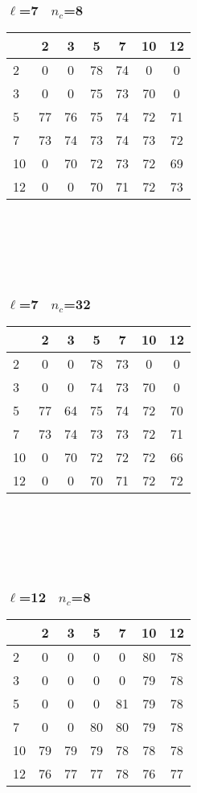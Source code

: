 \documentclass{article}
\begin{document}
\subsubsection*{$\ell$=7~ $n_c$=8}\begin{tabular}{|l|c|c|c|c|c|c|}
\hline
&2&3&5&7&10&12\\
\hline
2&0&0&78&74&0&0\\
3&0&0&75&73&70&0\\
5&77&76&75&74&72&71\\
7&73&74&73&74&73&72\\
10&0&70&72&73&72&69\\
12&0&0&70&71&72&73\\
\hline
\end{tabular}
\\ 
\\ \\ \\ 
\subsubsection*{$\ell$=7~ $n_c$=32}\begin{tabular}{|l|c|c|c|c|c|c|}
\hline
&2&3&5&7&10&12\\
\hline
2&0&0&78&73&0&0\\
3&0&0&74&73&70&0\\
5&77&64&75&74&72&70\\
7&73&74&73&73&72&71\\
10&0&70&72&72&72&66\\
12&0&0&70&71&72&72\\
\hline
\end{tabular}
\\ 
\\ \\ \\ 
\subsubsection*{$\ell$=12~ $n_c$=8}\begin{tabular}{|l|c|c|c|c|c|c|}
\hline
&2&3&5&7&10&12\\
\hline
2&0&0&0&0&80&78\\
3&0&0&0&0&79&78\\
5&0&0&0&81&79&78\\
7&0&0&80&80&79&78\\
10&79&79&79&78&78&78\\
12&76&77&77&78&76&77\\
\hline
\end{tabular}
\\ 
\\ \\ \\ 
\end{document}
